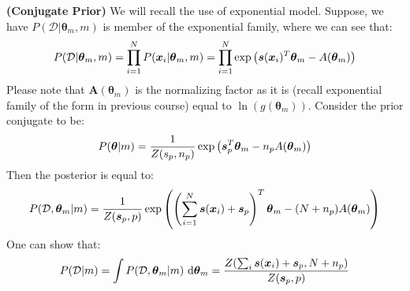 \begin{remark}{\textbf{(Conjugate Prior)}}
    We will recall the use of exponential model. Suppose, we have $P(\mathcal{D}|\boldsymbol \theta_m,m)$ is member of the exponential family, where we can see that:
    \begin{equation*}
        P(\mathcal{D}|\boldsymbol \theta_m, m) = \prod^N_{i=1}P(\boldsymbol x_i | \boldsymbol \theta_m, m) = \prod^N_{i=1}\exp\left( \boldsymbol s(\boldsymbol x_i)^T\boldsymbol \theta_m - A(\boldsymbol \theta_m) \right)
    \end{equation*}
    Please note that $\boldsymbol A(\boldsymbol \theta_m)$ is the normalizing factor as it is (recall exponential family of the form in previous course) equal to $\ln(g(\boldsymbol \theta_m))$. Consider the prior conjugate to be:
    \begin{equation*}
        P(\boldsymbol \theta | m) = \frac{1}{Z(s_p, n_p)}\exp\left( \boldsymbol s_p^T\boldsymbol \theta_m - n_pA(\boldsymbol \theta_m) \right)
    \end{equation*}
    Then the posterior is equal to:
    \begin{equation*}
        P(\mathcal{D}, \boldsymbol \theta_m | m) = \frac{1}{Z(\boldsymbol s_p, p)}\exp\left( \left( \sum^N_{i=1}\boldsymbol s(\boldsymbol x_i) + \boldsymbol s_p \right)^T\boldsymbol \theta_m - (N+n_p)A(\boldsymbol \theta_m) \right)
    \end{equation*}
    One can show that:
    \begin{equation*}
        P(\mathcal{D}|m) = \int P(\mathcal{D}, \boldsymbol \theta_m | m) \ \mathrm{d}\boldsymbol \theta_m = \frac{Z(\sum_i\boldsymbol s(\boldsymbol x_i) + \boldsymbol s_p, N + n_p)}{Z(\boldsymbol s_p, p)}
    \end{equation*}
\end{remark}


